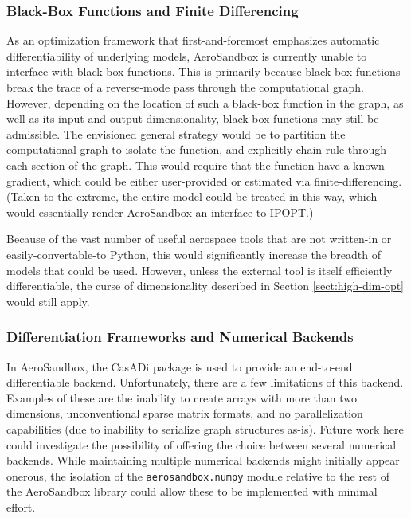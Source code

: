 \subsubsection{Black-Box Functions and Finite Differencing}
\label{sect:future-work-black-box}

As an optimization framework that first-and-foremost emphasizes automatic differentiability of underlying models, AeroSandbox is currently unable to interface with black-box functions. This is primarily because black-box functions break the trace of a reverse-mode pass through the computational graph. However, depending on the location of such a black-box function in the graph, as well as its input and output dimensionality, black-box functions may still be admissible. The envisioned general strategy would be to partition the computational graph to isolate the function, and explicitly chain-rule through each section of the graph. This would require that the function have a known gradient, which could be either user-provided or estimated via finite-differencing. (Taken to the extreme, the entire model could be treated in this way, which would essentially render AeroSandbox an interface to IPOPT.)

Because of the vast number of useful aerospace tools that are not written-in or easily-convertable-to Python, this would significantly increase the breadth of models that could be used. However, unless the external tool is itself efficiently differentiable, the curse of dimensionality described in Section \ref{sect:high-dim-opt} would still apply.


\subsubsection{Differentiation Frameworks and Numerical Backends}

In AeroSandbox, the CasADi package is used to provide an end-to-end differentiable backend. Unfortunately, there are a few limitations of this backend. Examples of these are the inability to create arrays with more than two dimensions, unconventional sparse matrix formats, and no parallelization capabilities (due to inability to serialize graph structures as-is). Future work here could investigate the possibility of offering the choice between several numerical backends. While maintaining multiple numerical backends might initially appear onerous, the isolation of the \texttt{aerosandbox.numpy} module relative to the rest of the AeroSandbox library could allow these to be implemented with minimal effort.

